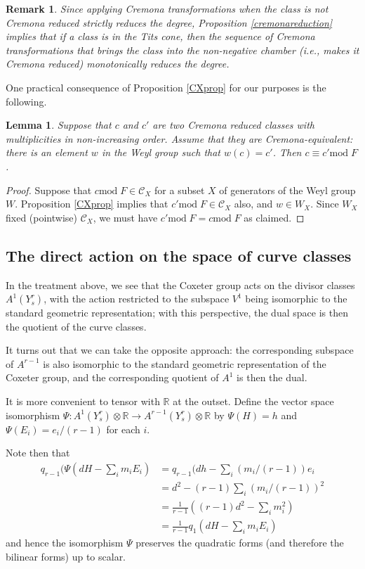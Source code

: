 \documentclass[12pt]{article}
\numberwithin{equation}{section}
\newtheorem{lemma}[equation]{Lemma}
\newtheorem{remark}[equation]{Remark}
\numberwithin{equation}{section}
\numberwithin{subeq}{equation}
\def\calC{\mathcal{C}}
\def\bbR{\mathbb{R}}
\def\mod{\text{mod}\;}
\begin{document}
\begin{remark}\label{rem:monotonic}
Since applying Cremona transformations when the class is not Cremona reduced strictly reduces the degree, Proposition \ref{cremonareduction} implies that if a class is in the Tits cone, then the sequence of Cremona transformations that brings the class into the non-negative chamber (i.e., makes it Cremona reduced) monotonically reduces the degree.
\end{remark}

One practical consequence of Proposition \ref{CXprop} for our purposes is the following.

\begin{lemma}\label{twoCremonareducedclasses}
Suppose that $c$ and $c'$ are two Cremona reduced classes
with multiplicities in non-increasing order.
Assume that they are Cremona-equivalent:
there is an element $w$ in the Weyl group such that $w(c)=c'$.
Then $c \equiv c' \mod F$.
\end{lemma}

\begin{proof}
Suppose that $c \mod F \in \calC_X$ for a subset $X$ of generators of the Weyl group $W$.
Proposition \ref{CXprop} implies that $c' \mod F \in \calC_X$ also,
and $w \in W_X$.
Since $W_X$ fixed (pointwise) $\calC_X$,
we must have $c' \mod F = c \mod F$ as claimed.
\end{proof}

\subsection{The direct action on the space of curve classes}
In the treatment above, we see that the Coxeter group acts on the divisor classes $A^1(Y^r_s)$, with the action restricted to the subspace $V^1$ being isomorphic to the standard geometric representation;
with this perspective, the dual space is then the quotient of the curve classes.

It turns out that we can take the opposite approach:
the corresponding subspace of $A^{r-1}$ is also isomorphic to the
standard geometric representation of the Coxeter group,
and the corresponding quotient of $A^1$ is then the dual.

It is more convenient to tensor with $\bbR$ at the outset.
Define the vector space isomorphism
$\Psi: A^1(Y^r_s)\otimes\bbR \to A^{r-1}(Y^r_s)\otimes\bbR$
by
$\Psi(H)=h$ and $\Psi(E_i) = e_i/(r-1)$ for each $i$.

Note then that
\begin{align*}
q_{r-1}(\Psi(dH-\sum_i m_i E_i)
&= q_{r-1}(dh-\sum_i (m_i/(r-1)) e_i \\
&= d^2 - (r-1)\sum_i (m_i/(r-1))^2 \\
&= \frac{1}{r-1} ((r-1)d^2 - \sum_i m_i^2) \\
&= \frac{1}{r-1} q_1(dH-\sum_i m_i E_i)
\end{align*}
and hence the isomorphism $\Psi$ preserves the quadratic forms 
(and therefore the bilinear forms) up to scalar.
\end{document}
